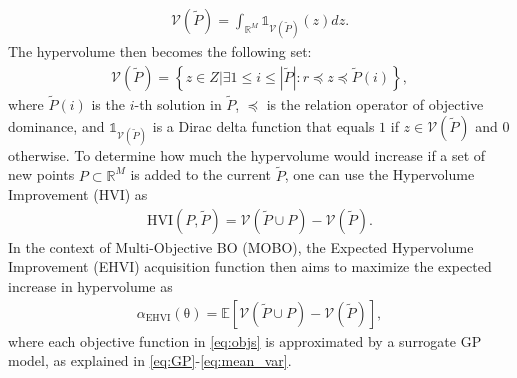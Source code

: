 \documentclass[10pt,twocolumn,twoside]{IEEEtran}
\newcommand{\vect}[1]{\ensuremath{\boldsymbol{\mathrm{#1}}}}
\begin{document}
\begin{align}
    \mathcal{V}(\tilde{P}) = \int_{\mathbb{R}^M} \mathds{1}_{\mathcal{V}(\tilde{P})}(z)dz.
\end{align}
The hypervolume then becomes the following set:
\begin{align}
   \mathcal{V}(\tilde{P}) =\left\{z\in Z\big|\exists 1\leq i\leq|\tilde P|:r\preceq z\preceq\tilde P(i)\right\},  
\end{align}
where $\tilde P(i)$ is the $i$-th solution in $\tilde P$, $\preceq$ is the relation operator of objective dominance, and $\mathds{1}_{\mathcal{V}(\tilde{P})}$ is a Dirac delta function that equals $1$ if $z\in\mathcal{V}(\tilde{P})$ and $0$ otherwise. To determine how much the hypervolume would increase if a set of new points $P\subset\mathbb{R}^M$ is added to the current $\tilde P$, one can use the Hypervolume Improvement (HVI) as
\begin{align}
    \text{HVI}(P,\tilde P)=\mathcal{V}(\tilde{P}\cup P)-\mathcal{V}(\tilde{P}).
\end{align}
In the context of Multi-Objective BO (MOBO), the Expected Hypervolume Improvement (EHVI) acquisition function then aims to maximize the expected increase in hypervolume as
\begin{align}
    \alpha_{\text{EHVI}}(\vect{\theta}) = \mathbb{E}[\mathcal{V}(\tilde{P}\cup P)-\mathcal{V}(\tilde{P})],
\end{align}
where each objective function in \eqref{eq:objs} is approximated by a surrogate GP model, as explained in \eqref{eq:GP}-\eqref{eq:mean_var}. 
\end{document}
